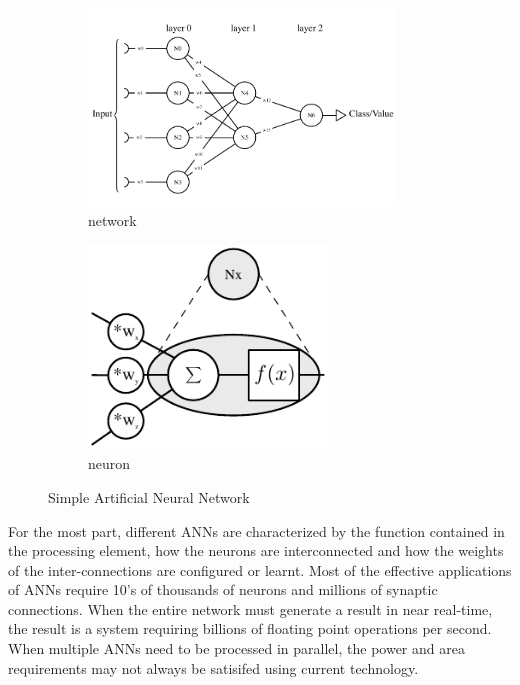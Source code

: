 \begin{figure}
\centering
\begin{subfigure}{.65\textwidth}
  \centering
  \includegraphics[width=0.9\textwidth]{Chapter-1/figs/simpleANN}
  \captionsetup{justification=centering, skip=-20pt}
  \caption{network}
  \label{fig:simpleNetwork}
\end{subfigure}%
\begin{subfigure}{.3\textwidth}
  \centering
  \includegraphics[width=0.7\textwidth]{Chapter-1/figs/cellContents}
  \captionsetup{justification=centering, skip=3pt}
  \caption{neuron}
  \label{fig:cellContents}
\end{subfigure}
\captionsetup{justification=centering, skip=10pt}
\caption{Simple Artificial Neural Network}
\label{fig:Simple Artificial Neural Network}
\end{figure}

For the most part, different ANNs are characterized by the function contained in the
processing element, how the neurons are interconnected and how the weights of the inter-connections are configured or learnt.
Most of the effective applications of ANNs require 10's of thousands of neurons and millions of synaptic connections.
When the entire network must generate a result in near real-time, the result is a system requiring billions
of floating point operations per second. When multiple ANNs need to be processed in parallel, the power and area requirements may not always be satisifed
using current technology.

